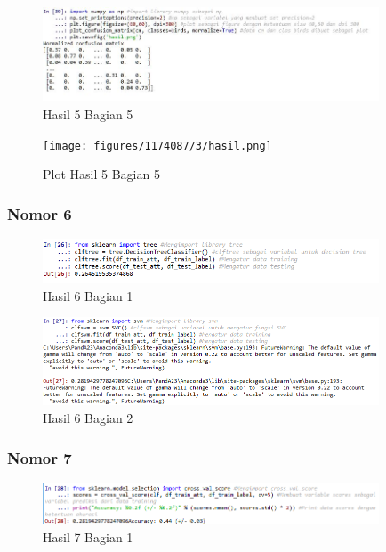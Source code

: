 
\begin{figure}[H]
\centerline{\includegraphics[width=10cm]{figures/1174087/3/36.png}}
\caption{Hasil 5 Bagian 5}
\label{labelgambar}
\end{figure}

\begin{figure}[H]
\centerline{\texttt{[image: figures/1174087/3/hasil.png]}}
\caption{Plot Hasil 5 Bagian 5}
\label{labelgambar}
\end{figure}

\subsubsection{Nomor 6}
\hfill\break

\begin{figure}[H]
\centerline{\includegraphics[width=10cm]{figures/1174087/3/29.png}}
\caption{Hasil 6 Bagian 1}
\label{labelgambar}
\end{figure}


\begin{figure}[H]
\centerline{\includegraphics[width=10cm]{figures/1174087/3/30.png}}
\caption{Hasil 6 Bagian 2}
\label{labelgambar}
\end{figure}

\subsubsection{Nomor 7}
\hfill\break

\begin{figure}[H]
\centerline{\includegraphics[width=10cm]{figures/1174087/3/31.png}}
\caption{Hasil 7 Bagian 1}
\label{labelgambar}
\end{figure}

